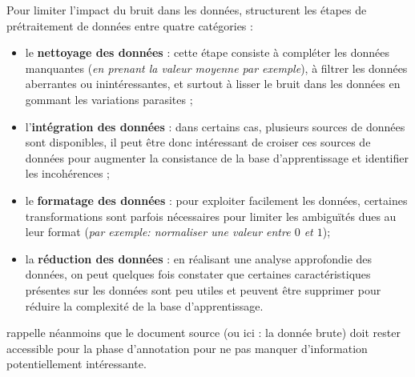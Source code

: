 			Pour limiter l'impact du bruit dans les données, \cite{alasadi-bhaya:2017:review-data-preprocessing} structurent les étapes de prétraitement de données entre quatre catégories :
			\begin{itemize}
				\item le \textbf{nettoyage des données} : cette étape consiste à compléter les données manquantes (\textit{en prenant la valeur moyenne par exemple}), à filtrer les données aberrantes ou inintéressantes, et surtout à lisser le bruit dans les données en gommant les variations parasites ;
				\item l'\textbf{intégration des données} : dans certains cas, plusieurs sources de données sont disponibles, il peut être donc intéressant de croiser ces sources de données pour augmenter la consistance de la base d'apprentissage et identifier les incohérences ;
				\item le \textbf{formatage des données} : pour exploiter facilement les données, certaines transformations sont parfois nécessaires pour limiter les ambiguïtés dues au leur format (\textit{par exemple: normaliser une valeur entre $0$ et $1$});
				\item la \textbf{réduction des données} : en réalisant une analyse approfondie des données, on peut quelques fois constater que certaines caractéristiques présentes sur les données sont peu utiles et peuvent être supprimer pour réduire la complexité de la base d'apprentissage.
			\end{itemize}
			\cite{baledent:2022:complexite-annotation-manuelle} rappelle néanmoins que le document source (ou ici : la donnée brute) doit rester accessible pour la phase d'annotation pour ne pas manquer d'information potentiellement intéressante.
